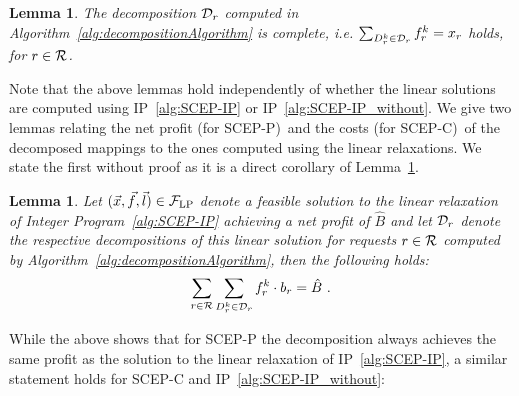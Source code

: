 \documentclass[10pt, conference, letterpaper]{IEEEtran}
\newtheorem{lemma}[theorem]{Lemma}
\begin{document}
\begin{lemma}
\label{lem:sum-of-f-mu}
The decomposition $\PotEmbeddings$ computed in Algorithm~\ref{alg:decompositionAlgorithm} is complete, i.e. $\sum_{D^k_{\req} \in \PotEmbeddings} f^k_{\req} = x_\req$ holds, for $r \in \mathcal{R}$.
\end{lemma}


Note that the above lemmas hold independently of whether the linear solutions are computed using IP~\ref{alg:SCEP-IP} or IP~\ref{alg:SCEP-IP_without}. We give two lemmas relating the net profit (for SCEP-P)~and the costs (for SCEP-C)~of the decomposed mappings to the ones computed using the linear relaxations. We state the first without proof as it is a direct corollary of Lemma~\ref{lem:sum-of-f-mu}.

\begin{lemma}
\label{lem:relation-of-net-profit-in-decomposition-and-the-LP-profit}
Let $(\vec{x}, \vec{f}, \vec{l}) \in  \mathcal{F}_{\textnormal{LP}}$ denote a \emph{feasible} solution to the linear relaxation of Integer Program~\ref{alg:SCEP-IP} achieving a net profit of $\hat{B}$ and let $\PotEmbeddings$ denote the respective decompositions of this linear solution for requests $r \in \mathcal{R}$ computed by Algorithm~\ref{alg:decompositionAlgorithm}, then the following holds:
\begin{align}
\sum_{\req \in \requests} \sum_{\decomp \in \PotEmbeddings} \prob \cdot \Vprofit = \hat{B}~.
\end{align}
\end{lemma}

While the above shows that for SCEP-P the decomposition always achieves the same profit as the solution to the linear relaxation of IP~\ref{alg:SCEP-IP}, a similar statement holds for SCEP-C and IP~\ref{alg:SCEP-IP_without}:
\end{document}
